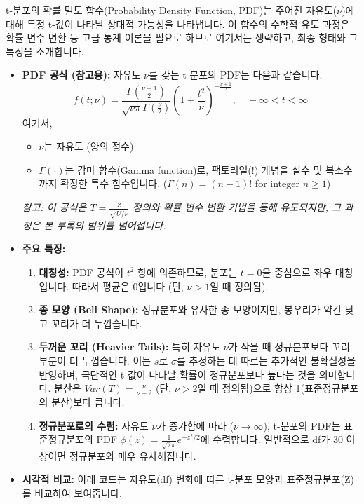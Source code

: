 \documentclass[
  letterpaper,
]{book}
\providecommand{\tightlist}{%
  \setlength{\itemsep}{0pt}\setlength{\parskip}{0pt}}
\begin{document}
t-분포의 확률 밀도 함수(Probability Density Function, PDF)는 주어진
자유도(\(\nu\))에 대해 특정 t-값이 나타날 상대적 가능성을 나타냅니다. 이
함수의 수학적 유도 과정은 확률 변수 변환 등 고급 통계 이론을 필요로
하므로 여기서는 생략하고, 최종 형태와 그 특징을 소개합니다.

\begin{itemize}
\item
  \textbf{PDF 공식 (참고용):} 자유도 \(\nu\)를 갖는 t-분포의 PDF는
  다음과 같습니다.
  \[f(t; \nu) = \frac{\Gamma\left(\frac{\nu+1}{2}\right)}{\sqrt{\nu\pi}\Gamma\left(\frac{\nu}{2}\right)} \left(1 + \frac{t^2}{\nu}\right)^{-\frac{\nu+1}{2}}, \quad -\infty < t < \infty\]
  여기서,

  \begin{itemize}
  \tightlist
  \item
    \(\nu\)는 자유도 (양의 정수)
  \item
    \(\Gamma(\cdot)\)는 감마 함수(Gamma function)로, 팩토리얼(!) 개념을
    실수 및 복소수까지 확장한 특수 함수입니다. (\(\Gamma(n) = (n-1)!\)
    for integer \(n \ge 1\))
  \end{itemize}

  \emph{참고: 이 공식은 \(T = \frac{Z}{\sqrt{U/\nu}}\) 정의와 확률 변수
  변환 기법을 통해 유도되지만, 그 과정은 본 부록의 범위를 넘어섭니다.}
\item
  \textbf{주요 특징:}

  \begin{enumerate}
  \def\labelenumi{\arabic{enumi}.}
  \tightlist
  \item
    \textbf{대칭성:} PDF 공식이 \(t^2\) 항에 의존하므로, 분포는
    \(t=0\)을 중심으로 좌우 대칭입니다. 따라서 평균은 0입니다 (단,
    \(\nu > 1\)일 때 정의됨).
  \item
    \textbf{종 모양 (Bell Shape):} 정규분포와 유사한 종 모양이지만,
    봉우리가 약간 낮고 꼬리가 더 두껍습니다.
  \item
    \textbf{두꺼운 꼬리 (Heavier Tails):} 특히 자유도 \(\nu\)가 작을 때
    정규분포보다 꼬리 부분이 더 두껍습니다. 이는 \(s\)로 \(\sigma\)를
    추정하는 데 따르는 추가적인 불확실성을 반영하며, 극단적인 t-값이
    나타날 확률이 정규분포보다 높다는 것을 의미합니다. 분산은
    \(Var(T) = \frac{\nu}{\nu-2}\) (단, \(\nu > 2\)일 때 정의됨)으로
    항상 1(표준정규분포의 분산)보다 큽니다.
  \item
    \textbf{정규분포로의 수렴:} 자유도 \(\nu\)가 증가함에 따라
    (\(\nu \to \infty\)), t-분포의 PDF는 표준정규분포의 PDF
    \(\phi(z) = \frac{1}{\sqrt{2\pi}} e^{-z^2/2}\)에 수렴합니다.
    일반적으로 df가 30 이상이면 정규분포와 매우 유사해집니다.
  \end{enumerate}
\item
  \textbf{시각적 비교:} 아래 코드는 자유도(df) 변화에 따른 t-분포 모양과
  표준정규분포(Z)를 비교하여 보여줍니다.
\end{itemize}
\end{document}
